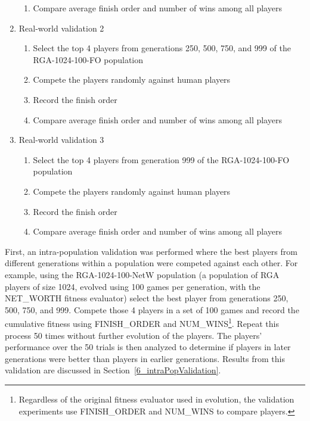 \begin{enumerate}
\begin{enumerate}
    \item {Compare average finish order and number of wins among all players}
  \end{enumerate}
  \item {Real-world validation 2}
  \begin{enumerate}
    \item {Select the top 4 players from generations 250, 500, 750, and 999 of 
    the RGA-1024-100-FO population}
    \item {Compete the players randomly against human players}
    \item {Record the finish order}
    \item {Compare average finish order and number of wins among all players}
  \end {enumerate}
  \item {Real-world validation 3}
  \begin{enumerate}
    \item {Select the top 4 players from generation 999 of the RGA-1024-100-FO
    population}
    \item {Compete the players randomly against human players}
    \item {Record the finish order}
    \item {Compare average finish order and number of wins among all players}
  \end {enumerate}
\end{enumerate}

First, an intra-population validation was performed where the best players from
different generations within a population were competed against each other.
For example, using the RGA-1024-100-NetW population (a population of RGA players
of size 1024, evolved using 100 games per generation, with the NET\_WORTH
fitness evaluator) select the best player from generations 250, 500, 750, and
999. Compete those 4 players in a set of 100 games and record the cumulative
fitness using FINISH\_ORDER and NUM\_WINS\footnote{Regardless of the original
fitness evaluator used in evolution, the validation experiments use
FINISH\_ORDER and NUM\_WINS to compare players.}. Repeat this process 50 times
without further evolution of the players. The players' performance over the 50
trials is then analyzed to determine if players in later generations were better
than players in earlier generations. Results from this validation are discussed
in Section~\ref{6_intraPopValidation}.

